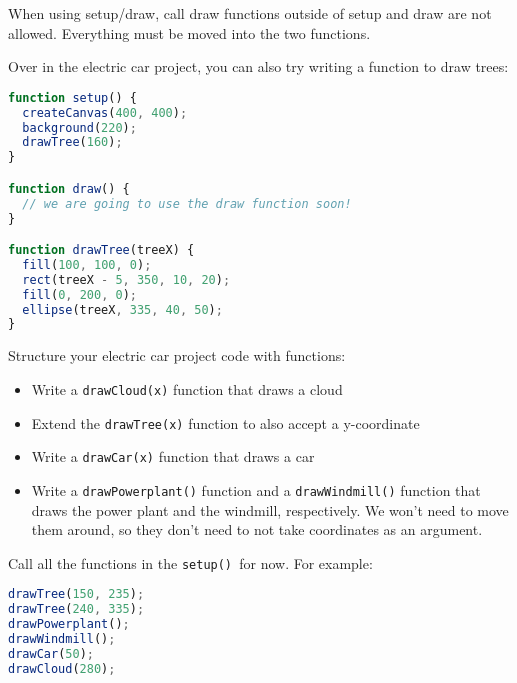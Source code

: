 \begin{exercisebox}[adjusted title=BE AWARE]

When using setup/draw, call draw functions outside of setup
and draw are not allowed. Everything must be moved into the two functions.

\end{exercisebox}


\begin{exercisebox}[adjusted title=Green City continued]
Over in the electric car project, you can also try writing a function
to draw trees:
\begin{lstlisting}[language=JavaScript]
 function setup() {
  createCanvas(400, 400);
  background(220);
  drawTree(160);
}

function draw() {
  // we are going to use the draw function soon!
}

function drawTree(treeX) {
  fill(100, 100, 0);
  rect(treeX - 5, 350, 10, 20);
  fill(0, 200, 0);
  ellipse(treeX, 335, 40, 50);
}
\end{lstlisting}

\noindent
Structure your electric car project code with functions:
\begin{itemize}
\item Write a \texttt{drawCloud(x)} function that draws a cloud
\item Extend the \texttt{drawTree(x)} function to also accept a y-coordinate
\item Write a \texttt{drawCar(x)} function that draws a car
\item Write a \texttt{drawPowerplant()} function and a
  \texttt{drawWindmill()} function that draws the power plant and
  the windmill, respectively. We won't need to move them around, so they don't need to
  not take coordinates as an argument.
\end{itemize}
\noindent
Call all the functions in the \texttt{setup() }for now. For example:

\begin{lstlisting}[language=JavaScript]
drawTree(150, 235);
drawTree(240, 335);
drawPowerplant();
drawWindmill();
drawCar(50);
drawCloud(280);
\end{lstlisting}

\end{exercisebox}
